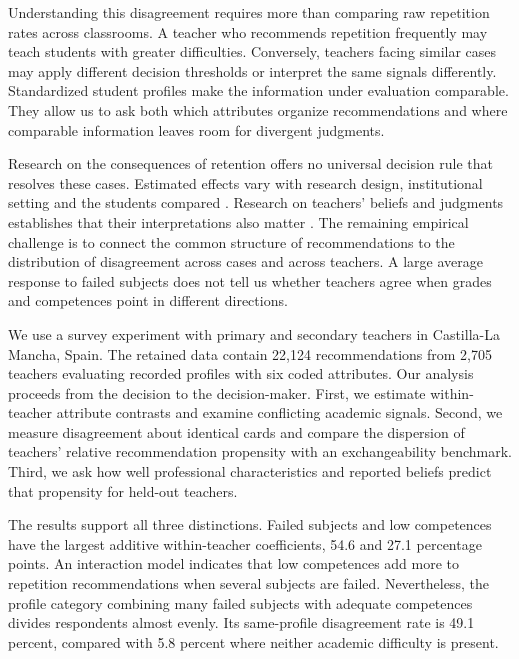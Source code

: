 Understanding this disagreement requires more than comparing raw repetition rates across classrooms. A teacher who recommends repetition frequently may teach students with greater difficulties. Conversely, teachers facing similar cases may apply different decision thresholds or interpret the same signals differently. Standardized student profiles make the information under evaluation comparable. They allow us to ask both which attributes organize recommendations and where comparable information leaves room for divergent judgments.

Research on the consequences of retention offers no universal decision rule that resolves these cases. Estimated effects vary with research design, institutional setting and the students compared \cite{allen,goos}. Research on teachers' beliefs and judgments establishes that their interpretations also matter \cite{tomchin,bonvin,klapproth}. The remaining empirical challenge is to connect the common structure of recommendations to the distribution of disagreement across cases and across teachers. A large average response to failed subjects does not tell us whether teachers agree when grades and competences point in different directions.

We use a survey experiment with primary and secondary teachers in Castilla-La Mancha, Spain. The retained data contain 22,124 recommendations from 2,705 teachers evaluating recorded profiles with six coded attributes. Our analysis proceeds from the decision to the decision-maker. First, we estimate within-teacher attribute contrasts and examine conflicting academic signals. Second, we measure disagreement about identical cards and compare the dispersion of teachers' relative recommendation propensity with an exchangeability benchmark. Third, we ask how well professional characteristics and reported beliefs predict that propensity for held-out teachers.


The results support all three distinctions. Failed subjects and low competences have the largest additive within-teacher coefficients, 54.6 and 27.1 percentage points. An interaction model indicates that low competences add more to repetition recommendations when several subjects are failed. Nevertheless, the profile category combining many failed subjects with adequate competences divides respondents almost evenly. Its same-profile disagreement rate is 49.1 percent, compared with 5.8 percent where neither academic difficulty is present.

